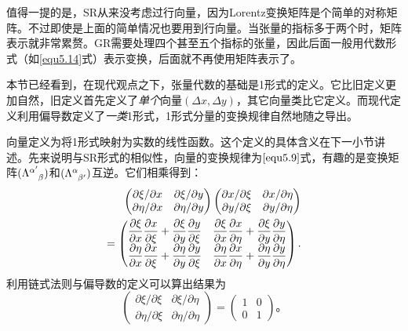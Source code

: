 值得一提的是，SR从来没考虑过行向量，因为Lorentz变换矩阵是个简单的对称矩阵。不过即使是上面的简单情况也要用到行向量。当张量的指标多于两个时，矩阵表示就非常累赘。GR需要处理四个甚至五个指标的张量，因此后面一般用代数形式（如\eqref{equ5.14}式）表示变换，后面就不再使用矩阵表示了。

本节已经看到，在现代观点之下，张量代数的基础是1形式的定义。它比旧定义更加自然，旧定义首先定义了\textit{单个}向量$(\Delta x, \Delta y)$，其它向量类比它定义。而现代定义利用偏导数定义了\textit{一类}1形式，1形式分量的变换规律自然地随之导出。

向量定义为将1形式映射为实数的线性函数。这个定义的具体含义在下一小节讲述。先来说明与SR形式的相似性，向量的变换规律为$\eqref{equ5.9}$式，有趣的是变换矩阵$(\Lambda\indices{^{\alpha'}_\beta})$和$( \Lambda\indices{^\alpha_{\beta'}} )$互逆。它们相乘得到：
\begin{align}
    \begin{pmatrix}
        \partial \xi / \partial x & \partial \xi / \partial y \\
        \partial \eta / \partial x & \partial \eta / \partial y 
    \end{pmatrix}
    \begin{pmatrix}
        \partial x / \partial \xi & \partial x / \partial \eta \\
        \partial y / \partial \xi & \partial y / \partial \eta
    \end{pmatrix} \notag \\
    =
    \begin{pmatrix}
        \dfrac{\partial \xi}{\partial x} \dfrac{\partial x}{\partial \xi} + \dfrac{\partial \xi}{\partial y} \dfrac{\partial y}{\partial \xi} & \dfrac{\partial \xi}{\partial x} \dfrac{\partial x}{\partial \eta} + \dfrac{\partial \xi}{\partial y} \dfrac{\partial y}{\partial \eta}  \\
        \dfrac{\partial \eta}{\partial x} \dfrac{\partial x}{\partial \xi} + \dfrac{\partial \eta}{\partial y} \dfrac{\partial y}{\partial \xi} & \dfrac{\partial \eta}{\partial x} \dfrac{\partial x}{\partial \eta} + \dfrac{\partial \eta}{\partial y} \dfrac{\partial y}{\partial \eta}
    \end{pmatrix}.
\label{equ5.15}
\end{align}
利用链式法则与偏导数的定义可以算出结果为
\begin{equation}
    \begin{pmatrix}
        \partial \xi / \partial \xi & \partial \xi / \partial \eta \\
        \partial \eta / \partial \xi & \partial \eta / \partial \eta
    \end{pmatrix}
    = 
    \begin{pmatrix}
        1 & 0 \\
        0 & 1
    \end{pmatrix}。
\label{equ5.16}
\end{equation}

